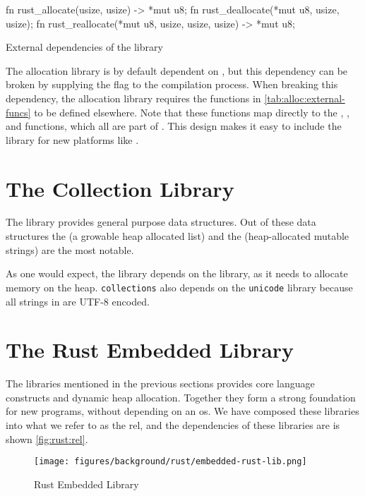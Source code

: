 \begin{listing}[H]
  \begin{rustcode}
fn rust_allocate(usize, usize) -> *mut u8;
fn rust_deallocate(*mut u8, usize, usize);
fn rust_reallocate(*mut u8, usize, usize, usize) -> *mut u8;
  \end{rustcode}
  \caption{External dependencies of the  library}
  \label{tab:alloc:external-funcs}
\end{listing}

The allocation library is by default dependent on , but this dependency can be broken by supplying the  flag to the compilation process.
When breaking this dependency, the allocation library requires the functions in \autoref{tab:alloc:external-funcs} to be defined elsewhere.
Note that these functions map directly to the , , and  functions, which all are part of {\newlib}.
This design makes it easy to include the {} library for new platforms like {\rg}.

\section{The Collection Library}

The {\rust}  library provides general purpose data structures.
Out of these data structures the  (a growable heap allocated list) and the  (heap-allocated mutable strings) are the most notable.

As one would expect, the  library depends on the  library, as it needs to allocate memory on the heap.
\texttt{collections} also depends on the \texttt{unicode} library because all strings in {\rust} are UTF-8 encoded.

\section{The Rust Embedded Library}
\label{sec:rel}

The libraries mentioned in the previous sections provides core language constructs and dynamic heap allocation.
Together they form a strong foundation for new {\rust} programs, without depending on an \gls{os}.
We have composed these libraries into what we refer to as the \gls{rel}, and the dependencies of these libraries are is shown \autoref{fig:rust:rel}.

\begin{figure}[H]
  \begin{center}
    \texttt{[image: figures/background/rust/embedded-rust-lib.png]}
  \end{center}
  \caption{Rust Embedded Library}
  \label{fig:rust:rel}
\end{figure}

